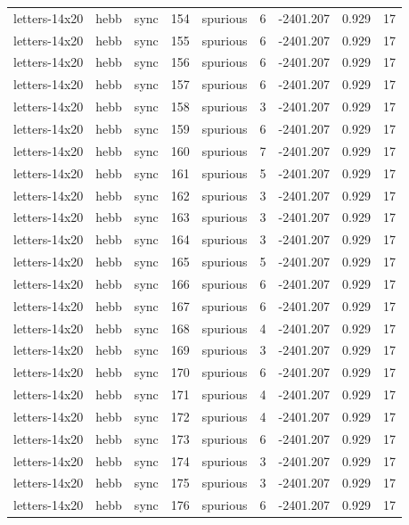\begin{tabular}{lllrlrrrr}
letters-14x20 & hebb & sync & 154 & spurious & 6 & -2401.207 & 0.929 & 17 \\
letters-14x20 & hebb & sync & 155 & spurious & 6 & -2401.207 & 0.929 & 17 \\
letters-14x20 & hebb & sync & 156 & spurious & 6 & -2401.207 & 0.929 & 17 \\
letters-14x20 & hebb & sync & 157 & spurious & 6 & -2401.207 & 0.929 & 17 \\
letters-14x20 & hebb & sync & 158 & spurious & 3 & -2401.207 & 0.929 & 17 \\
letters-14x20 & hebb & sync & 159 & spurious & 6 & -2401.207 & 0.929 & 17 \\
letters-14x20 & hebb & sync & 160 & spurious & 7 & -2401.207 & 0.929 & 17 \\
letters-14x20 & hebb & sync & 161 & spurious & 5 & -2401.207 & 0.929 & 17 \\
letters-14x20 & hebb & sync & 162 & spurious & 3 & -2401.207 & 0.929 & 17 \\
letters-14x20 & hebb & sync & 163 & spurious & 3 & -2401.207 & 0.929 & 17 \\
letters-14x20 & hebb & sync & 164 & spurious & 3 & -2401.207 & 0.929 & 17 \\
letters-14x20 & hebb & sync & 165 & spurious & 5 & -2401.207 & 0.929 & 17 \\
letters-14x20 & hebb & sync & 166 & spurious & 6 & -2401.207 & 0.929 & 17 \\
letters-14x20 & hebb & sync & 167 & spurious & 6 & -2401.207 & 0.929 & 17 \\
letters-14x20 & hebb & sync & 168 & spurious & 4 & -2401.207 & 0.929 & 17 \\
letters-14x20 & hebb & sync & 169 & spurious & 3 & -2401.207 & 0.929 & 17 \\
letters-14x20 & hebb & sync & 170 & spurious & 6 & -2401.207 & 0.929 & 17 \\
letters-14x20 & hebb & sync & 171 & spurious & 4 & -2401.207 & 0.929 & 17 \\
letters-14x20 & hebb & sync & 172 & spurious & 4 & -2401.207 & 0.929 & 17 \\
letters-14x20 & hebb & sync & 173 & spurious & 6 & -2401.207 & 0.929 & 17 \\
letters-14x20 & hebb & sync & 174 & spurious & 3 & -2401.207 & 0.929 & 17 \\
letters-14x20 & hebb & sync & 175 & spurious & 3 & -2401.207 & 0.929 & 17 \\
letters-14x20 & hebb & sync & 176 & spurious & 6 & -2401.207 & 0.929 & 17 \\

\end{tabular}
